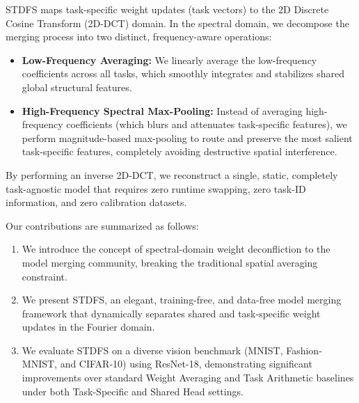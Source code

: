 \documentclass{article}
\theoremstyle{plain}
\theoremstyle{definition}
\theoremstyle{remark}
\begin{document}
STDFS maps task-specific weight updates (task vectors) to the 2D Discrete Cosine Transform (2D-DCT) domain. In the spectral domain, we decompose the merging process into two distinct, frequency-aware operations:
\begin{itemize}
    \item \textbf{Low-Frequency Averaging:} We linearly average the low-frequency coefficients across all tasks, which smoothly integrates and stabilizes shared global structural features.
    \item \textbf{High-Frequency Spectral Max-Pooling:} Instead of averaging high-frequency coefficients (which blurs and attenuates task-specific features), we perform magnitude-based max-pooling to route and preserve the most salient task-specific features, completely avoiding destructive spatial interference.
\end{itemize}
By performing an inverse 2D-DCT, we reconstruct a single, static, completely task-agnostic model that requires zero runtime swapping, zero task-ID information, and zero calibration datasets.

Our contributions are summarized as follows:
\begin{enumerate}\itemsep=1pt \topsep=1pt \parsep=0pt
    \item We introduce the concept of spectral-domain weight deconfliction to the model merging community, breaking the traditional spatial averaging constraint.
    \item We present STDFS, an elegant, training-free, and data-free model merging framework that dynamically separates shared and task-specific weight updates in the Fourier domain.
    \item We evaluate STDFS on a diverse vision benchmark (MNIST, Fashion-MNIST, and CIFAR-10) using ResNet-18, demonstrating significant improvements over standard Weight Averaging and Task Arithmetic baselines under both Task-Specific and Shared Head settings.
\end{enumerate}
\end{document}
